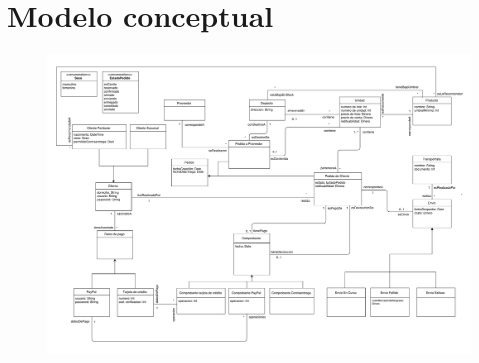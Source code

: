 \section{Modelo conceptual}

\begin{figure}[H]
  \begin{center}
  \includegraphics[angle=90,height=0.98\textheight]{tp2/images/conceptual.pdf}
  \end{center}
\end{figure}

\newpage

